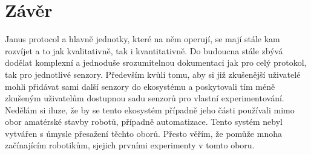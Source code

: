 \newpage
\chapter*{Závěr}

Janus protocol a hlavně jednotky, které na něm operují, se mají stále kam rozvíjet a to jak kvalitativně, tak i kvantitativně.
Do budoucna stále zbývá dodělat komplexní a jednoduše srozumitelnou dokumentaci jak pro celý protokol, tak pro jednotlivé senzory.
Především kvůli tomu, aby si již zkušenější uživatelé mohli přidávat sami další senzory do ekosystému a poskytovali tím méně zkušeným uživatelům dostupnou sadu senzorů pro vlastní experimentování.
Nedělám si iluze, že by se tento ekosystém případně jeho části používali mimo obor amatérské stavby robotů, případně automatizace.
Tento systém nebyl vytvářen s úmysle přesažení těchto oborů. Přesto věřím, že pomůže mnoha začínajícím robotikům, sjejich prvními experimenty v tomto oboru. 
